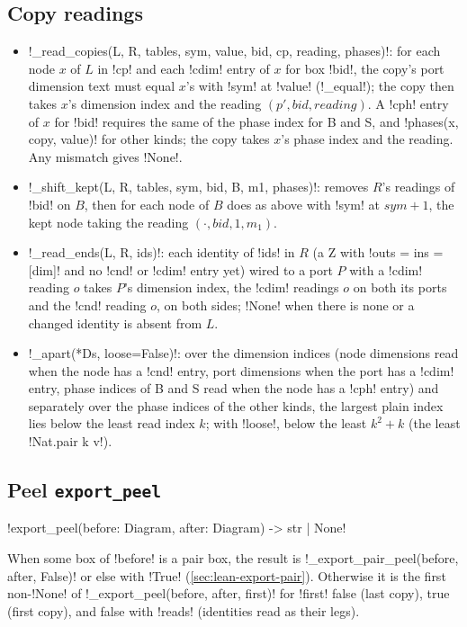 {{{\subsection{Copy readings}

\begin{itemize}
\item \lexpy!_read_copies(L, R, tables, sym, value, bid, cp, reading, phases)!: for each node $x$ of
$L$ in \lexcode!cp! and each \lexcode!cdim! entry of $x$ for box \lexcode!bid!, the copy's port dimension
text must equal $x$'s with \lexcode!sym! at \lexcode!value! (\lexpy!_equal!); the copy then takes $x$'s
dimension index and the reading $(p', \mathit{bid}, \mathit{reading})$. A \lexcode!cph! entry of $x$
for \lexcode!bid! requires the same of the phase index for B and S, and \lexpy!phases(x, copy, value)!
for other kinds; the copy takes $x$'s phase index and the reading. Any mismatch gives \lexpy!None!.
\item \lexpy!_shift_kept(L, R, tables, sym, bid, B, m1, phases)!: removes $R$'s readings of
\lexcode!bid! on $B$, then for each node of $B$ does as above with \lexcode!sym! at $\mathit{sym}+1$,
the kept node taking the reading $(\cdot, \mathit{bid}, 1, m_1)$.
\item \lexpy!_read_ends(L, R, ids)!: each identity of \lexcode!ids! in $R$ (a Z with
\lexlean!outs = ins = [dim]! and no \lexcode!cnd! or \lexcode!cdim! entry yet) wired to a port $P$ with a
\lexcode!cdim! reading $o$ takes $P$'s dimension index, the \lexcode!cdim! readings $o$ on both its ports
and the \lexcode!cnd! reading $o$, on both sides; \lexpy!None! when there is none or a changed identity
is absent from $L$.
\item \lexpy!_apart(*Ds, loose=False)!: over the dimension indices (node dimensions read when the
node has a \lexcode!cnd! entry, port dimensions when the port has a \lexcode!cdim! entry, phase indices
of B and S read when the node has a \lexcode!cph! entry) and separately over the phase indices of the
other kinds, the largest plain index lies below the least read index $k$; with \lexcode!loose!,
below the least $k^2 + k$ (the least \lexlean!Nat.pair k v!).
\end{itemize}

\subsection{Peel \texttt{export\_peel}}

\begin{signature}
\lexpy!export_peel(before: Diagram, after: Diagram) -> str | None!
\end{signature}
When some box of \lexcode!before! is a pair box, the result is
\lexpy!_export_pair_peel(before, after, False)! or else with \lexpy!True!
(\cref{sec:lean-export-pair}). Otherwise it is the first non-\lexpy!None! of
\lexpy!_export_peel(before, after, first)! for \lexcode!first! false (last copy), true (first copy),
and false with \lexcode!reads! (identities read as their legs).

}}}

